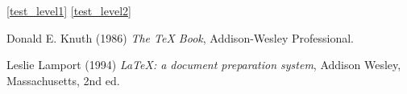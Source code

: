 \label{test_level1}
\usepackage{wasysym}



\ref{test_level1}
\ref{test_level2}

\degreeCelsius

\clock

\begin{thebibliography}{9}
Donald E. Knuth (1986) \emph{The \TeX{} Book}, Addison-Wesley Professional.

Leslie Lamport (1994) \emph{\LaTeX: a document preparation system}, Addison
Wesley, Massachusetts, 2nd ed.
\end{thebibliography}